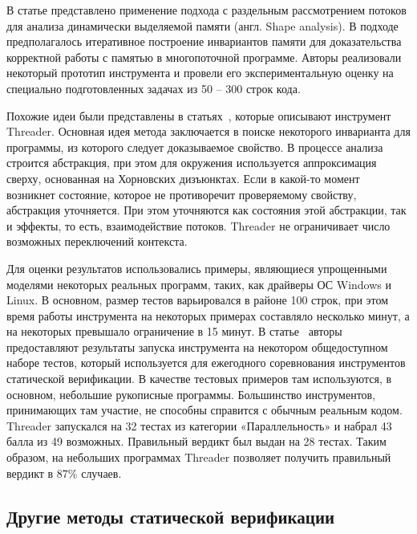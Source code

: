 В статье\cite{ShapeTM} представлено применение подхода с раздельным рассмотрением потоков для анализа динамически выделяемой памяти (англ. Shape analysis). 
В подходе предполагалось итеративное построение инвариантов памяти для доказательства корректной работы с памятью в многопоточной программе.
Авторы реализовали некоторый прототип инструмента и провели его экспериментальную оценку на специально подготовленных задачах из 50 -- 300 строк кода.

Похожие идеи были представлены в статьях~\cite{Threader:2011,Gupta:2011:POPL,Gupta:2011}, которые описывают инструмент Threader.
Основная идея метода заключается в поиске некоторого инварианта для программы, из которого следует доказываемое свойство.
В процессе анализа строится абстракция, при этом для окружения используется аппроксимация сверху, основанная на Хорновских дизъюнктах.
Если в какой-то момент возникнет состояние, которое не противоречит проверяемому свойству, абстракция уточняется.
При этом уточняются как состояния этой абстракции, так и эффекты, то есть, взаимодействие потоков.
Threader не ограничивает число возможных переключений контекста.

Для оценки результатов использовались примеры, являющиеся упрощенными моделями некоторых реальных программ, таких, как драйверы ОС Windows и Linux.
В основном, размер тестов варьировался в районе 100 строк, при этом время работы инструмента на некоторых примерах составляло несколько минут, а на некоторых превышало ограничение в 15 минут. 
В статье~\cite{Threader:svcomp} авторы предоставляют результаты запуска инструмента на некотором общедоступном наборе тестов, который используется для ежегодного соревнования инструментов статической верификации. 
В качестве тестовых примеров там используются, в основном, небольшие рукописные программы.
Большинство инструментов, принимающих там участие, не способны справится с обычным реальным кодом.
Threader запускался на 32 тестах из категории «Параллельность» и набрал 43 балла из 49 возможных. Правильный вердикт был выдан на 28 тестах.
Таким образом, на небольших программах Threader позволяет получить правильный вердикт в 87\% случаев.


\subsection{Другие методы статической верификации}

